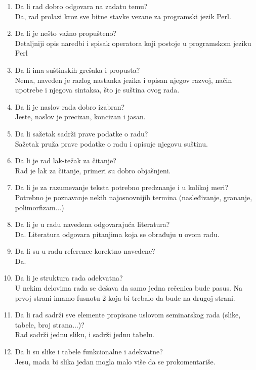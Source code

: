 \documentclass[a4paper]{report}
\begin{document}
\begin{enumerate}
\item Da li rad dobro odgovara na zadatu temu?\\ 
Da, rad prolazi kroz sve bitne stavke vezane za programski jezik Perl.
\item Da li je nešto važno propušteno?\\ 
Detaljniji opis naredbi i spisak operatora koji postoje u programskom jeziku Perl
\item Da li ima suštinskih grešaka i propusta?\\ 
Nema, naveden je razlog nastanka jezika i opisan njegov razvoj, način upotrebe i njegova sintaksa, što je suština ovog rada.
\item Da li je naslov rada dobro izabran?\\ 
Jeste, naslov je precizan, koncizan i jasan.
\item Da li sažetak sadrži prave podatke o radu?\\ 
Sažetak pruža prave podatke o radu i opisuje njegovu suštinu. 
\item Da li je rad lak-težak za čitanje?\\ 
Rad je lak za čitanje, primeri su dobro objašnjeni.
\item Da li je za razumevanje teksta potrebno predznanje i u kolikoj meri?\\ 
Potrebno je poznavanje nekih najosnovnijih termina (nasleđivanje, grananje, polimorfizam...)
\item Da li je u radu navedena odgovarajuća literatura?\\ 
Da. Literatura odgovara pitanjima koja se obrađuju u ovom radu.
\item Da li su u radu reference korektno navedene?\\ 
Da.
\item Da li je struktura rada adekvatna?\\ 
U nekim delovima rada se dešava da samo jedna rečenica bude pasus. Na prvoj strani imamo fusnotu 2 koja bi trebalo da bude na drugoj strani.
\item Da li rad sadrži sve elemente propisane uslovom seminarskog rada (slike, tabele, broj strana...)?\\ 
Rad sadrži jednu sliku, i sadrži jednu tabelu. 
\item Da li su slike i tabele funkcionalne i adekvatne?\\ 
Jesu, mada bi slika jedan mogla malo više da se prokomentariše.
\end{enumerate}
\end{document}
